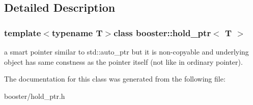 \subsection{Detailed Description}
\subsubsection*{template$<$typename T$>$class booster\-::hold\-\_\-ptr$<$ T $>$}

a smart pointer similar to std\-::auto\-\_\-ptr but it is non-\/copyable and underlying object has same constness as the pointer itself (not like in ordinary pointer). 

The documentation for this class was generated from the following file\-:\begin{DoxyCompactItemize}
\item 
booster/hold\-\_\-ptr.\-h\end{DoxyCompactItemize}
